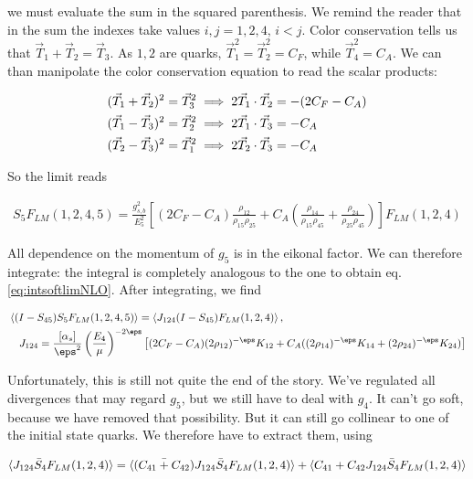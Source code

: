 \documentclass[11pt]{report}
\begin{document}
we must evaluate the sum in the squared parenthesis. We remind the reader that in the sum the indexes take values \(i, j = 1, 2, 4, \, i < j\). Color conservation tells us that \(\vec{T}_1 + \vec{T}_2 = \vec{T}_3\). As \(1, 2\) are quarks, \(\vec{T}_1^2 = \vec{T}_2^2 = C_F\), while \(\vec{T}_4^2 = C_A\). We can than manipolate the color conservation equation to read the scalar products: 

\begin{align}
    &(\vec{T}_1 + \vec{T}_2)^2 = \vec{T}_3^2 \implies 2\vec{T}_1\cdot \vec{T}_2 = -(2C_F - C_A) \notag \\ 
    &(\vec{T}_1 - \vec{T}_3)^2 = \vec{T}_2^2 \implies 2\vec{T}_1\cdot \vec{T}_3 = - C_A \notag \\
    &(\vec{T}_2 - \vec{T}_3)^2 = \vec{T}_1^2 \implies 2\vec{T}_2\cdot \vec{T}_3 = - C_A
\end{align}

So the limit reads 

\begin{align}
    S_5 F_{LM}(1, 2, 4, 5) = \frac{g^2_{s, b}}{E_5^2}\left[ (2C_F - C_A)\frac{\rho_{12}}{\rho_{15}\rho_{25}}  + C_A \left( \frac{\rho_{14}}{\rho_{15}\rho_{45}} + \frac{\rho_{24}}{\rho_{25}\rho_{45}} \right)\right] F_{LM}(1,2,4)
\end{align}

All dependence on the momentum of \(g_5\) is in the eikonal factor. We can therefore integrate: the integral is completely analogous to the one to obtain eq. \ref{eq:intsoftlimNLO}. After integrating, we find 

\begin{align}
    &\braket{(I-S_{45})S_5 F_{LM}(1, 2, 4, 5)} = \braket{J_{124} (I-S_{45})F_{LM}(1, 2, 4)}, \notag \\ 
    &\quad J_{124} = \frac{[\alpha_s]}{\eps^2}\left( \frac{E_4}{\mu} \right)^{-2\eps}\left[ (2C_F-C_A)(2\rho_{12})^{-\eps}K_{12} + C_A((2\rho_{14})^{-\eps}K_{14} + (2\rho_{24})^{-\eps}K_{24}) \right]
\end{align}

Unfortunately, this is still not quite the end of the story. We've regulated all divergences that may regard \(g_5\), but we still have to deal with \(g_4\). It can't go soft, because we have removed that possibility. But it can still go collinear to one of the initial state quarks. We therefore have to extract them, using 

\begin{align}
    \braket{J_{124}\bar{S}_4 F_{LM}(1, 2, 4)} = \braket{(\bar{C_{41} + C_{42}})J_{124}\bar{S}_4F_{LM}(1, 2, 4)} + \braket{C_{41} + C_{42}J_{124}\bar{S}_4F_{LM}(1, 2, 4)} 
\end{align}
\end{document}
